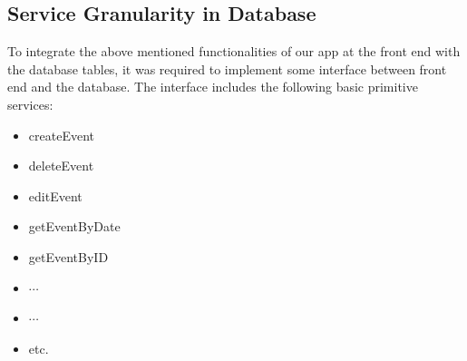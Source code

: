 \documentclass[10pt,a4paper]{report}
\begin{document}
 \subsection{Service Granularity in Database}

   To integrate the above mentioned functionalities of our app at the front end with the database tables, it was required to implement some interface between front end and the database. The interface includes the following basic primitive services:
   \begin{itemize}
   	  \item createEvent
      \item deleteEvent
      \item editEvent
      \item getEventByDate
      \item getEventByID
      \item $\cdots$
      \item $\cdots$
      \item etc.
   \end{itemize}
\end{document}
